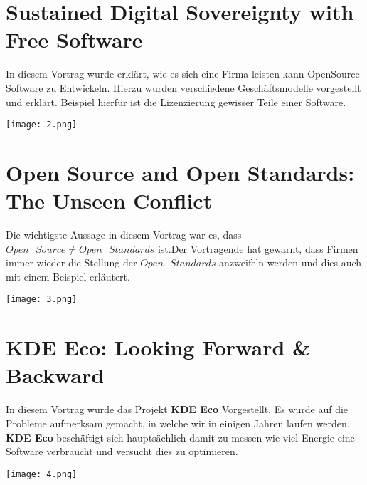 \documentclass[10pt,ngerman]{scrartcl}
\begin{document}
\section*{Sustained Digital Sovereignty with Free Software}
\begin{minipage}[b]{0.65\linewidth}
In diesem Vortrag wurde erklärt, wie es sich eine Firma leisten kann OpenSource Software zu Entwickeln. Hierzu wurden verschiedene Geschäftsmodelle vorgestellt und erklärt. Beispiel hierfür ist die Lizenzierung gewisser Teile einer Software.
\end{minipage}
\hfill
\begin{minipage}[b]{0.35\linewidth}
\begin{flushright}
\texttt{[image: 2.png]}
\end{flushright}
\end{minipage}

\section*{Open Source and Open Standards: The Unseen Conflict}
\begin{minipage}[b]{0.65\linewidth}
Die wichtigste Aussage in diesem Vortrag war es, dass $Open\text{ }Source \neq Open\text{ }Standards$ ist.Der Vortragende hat gewarnt, dass Firmen immer wieder die Stellung der $Open\text{ }Standards$ anzweifeln werden und dies auch mit einem Beispiel erläutert.
\end{minipage}
\hfill
\begin{minipage}[b]{0.35\linewidth}
\begin{flushright}
\texttt{[image: 3.png]}
\end{flushright}
\end{minipage}

\section*{KDE Eco: Looking Forward \& Backward}
\begin{minipage}[b]{0.65\linewidth}
In diesem Vortrag wurde das Projekt \textbf{KDE Eco} Vorgestellt. Es wurde auf die Probleme aufmerksam gemacht, in welche wir in einigen Jahren laufen werden. \textbf{KDE Eco} beschäftigt sich hauptsächlich damit zu messen wie viel Energie eine Software verbraucht und versucht dies zu optimieren.
\end{minipage}
\hfill
\begin{minipage}[b]{0.35\linewidth}
\begin{flushright}
\texttt{[image: 4.png]}
\end{flushright}
\end{minipage}
\end{document}
